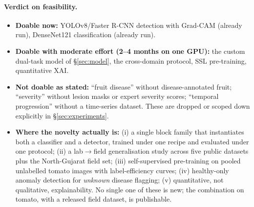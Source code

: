 \paragraph{Verdict on feasibility.}
\begin{itemize}
  \item \textbf{Doable now:} YOLOv8/Faster R-CNN detection with Grad-CAM (already run), DenseNet121 classification (already run).
  \item \textbf{Doable with moderate effort (2--4 months on one GPU):} the custom dual-task model of \S\ref{sec:model}, the cross-domain protocol, SSL pre-training, quantitative XAI.
  \item \textbf{Not doable as stated:} ``fruit disease'' without disease-annotated fruit; ``severity'' without lesion masks or expert severity scores; ``temporal progression'' without a time-series dataset. These are dropped or scoped down explicitly in \S\ref{sec:experiments}.
  \item \textbf{Where the novelty actually is:} (i) a single block family that instantiates both a classifier and a detector, trained under one recipe and evaluated under one protocol; (ii) a lab$\rightarrow$field generalisation study across five public datasets plus the North-Gujarat field set; (iii) self-supervised pre-training on pooled unlabelled tomato images with label-efficiency curves; (iv) healthy-only anomaly detection for \emph{unknown} disease flagging; (v) quantitative, not qualitative, explainability. No single one of these is new; the combination on tomato, with a released field dataset, is publishable.
\end{itemize}
